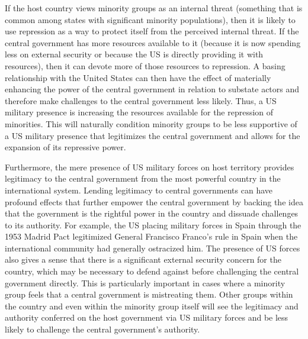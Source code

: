 If the host country views minority groups as an internal threat (something that is common among states with significant minority populations), then it is likely to use repression as a way to protect itself from the perceived internal threat.\cite{Regan2005,Jakobsen2009,Brathwaite2014,Hendrix2019}  If the central government has more resources available to it (because it is now spending less on external security or because the US is directly providing it with resources), then it can devote more of those resources to repression.  A basing relationship with the United States can then have the effect of materially enhancing the power of the central government in relation to substate actors and therefore make challenges to the central government less likely. Thus, a US military presence is increasing the resources available for the repression of minorities.  This will naturally condition minority groups to be less supportive of a US military presence that legitimizes the central government and allows for the expansion of its repressive power.

Furthermore, the mere presence of US military forces on host territory provides legitimacy to the central government from the most powerful country in the international system. Lending legitimacy to central governments can have profound effects that further empower the central government by backing the idea that the government is the rightful power in the country and dissuade challenges to its authority.  For example, the US placing military forces in Spain through the 1953 Madrid Pact legitimized General Francisco Franco's rule in Spain when the international community had generally ostracized him.\cite{Cooley2008} The presence of US forces also gives a sense that there is a significant external security concern for the country, which may be necessary to defend against before challenging the central government directly. This is particularly important in cases where a minority group feels that a central government is mistreating them. Other groups within the country and even within the minority group itself will see the legitimacy and authority conferred on the host government via US military forces and be less likely to challenge the central government's authority. 

